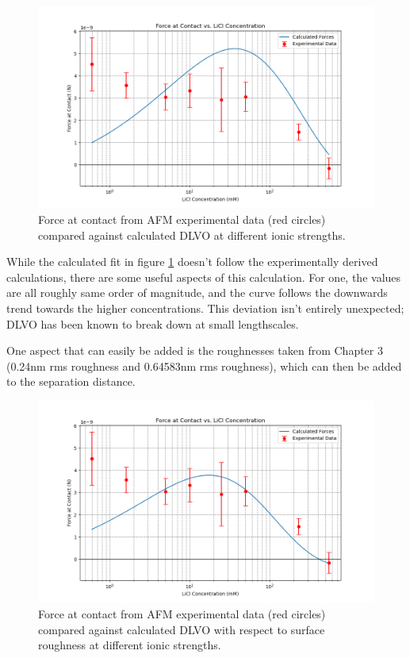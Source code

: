 \begin{figure}[h!]
\centering
\includegraphics[width=\textwidth]{chapter8/Calculated/No_roughness.png}
\caption{Force at contact from AFM experimental data (red circles) compared against calculated DLVO at different ionic strengths.}
\label{fig:calc1}
\end{figure}

While the calculated fit in figure \ref{fig:calc1} doesn't follow the experimentally derived calculations, there are some useful aspects of this calculation. For one, the values are all roughly same order of magnitude, and the curve follows the downwards trend towards the higher concentrations. This deviation isn't entirely unexpected; DLVO has been known to break down at small lengthscales. \cite{Horinek2014}

One aspect that can easily be added is the roughnesses taken from Chapter 3 (0.24nm rms roughness and 0.64583nm rms roughness), which can then be added to the separation distance.

\begin{figure}[h!]
\centering
\includegraphics[width=\textwidth]{chapter8/Calculated/roughness.png}
\caption{Force at contact from AFM experimental data (red circles) compared against calculated DLVO with respect to surface roughness at different ionic strengths.}
\label{fig:calc2}
\end{figure}

